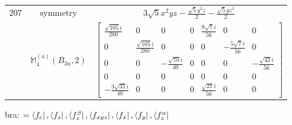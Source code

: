 \documentclass[fleqn,8pt,landscape]{jsarticle}
\begin{document}
\begin{longtable}{ccc}
$ 207 $ & $ \text{symmetry} $ & $ 3 \sqrt{5} x^{2} y z - \frac{\sqrt{5} y^{3} z}{2} - \frac{\sqrt{5} y z^{3}}{2} $ \\
$  $ & $ \mathbb{M}_{4}^{(a)}(B_{3u},2) $ & $ \begin{bmatrix} \frac{\sqrt{105} i}{280} & 0 & 0 & 0 & \frac{9 \sqrt{7} i}{56} & 0 & 0 \\ 0 & \frac{\sqrt{105} i}{280} & 0 & 0 & 0 & - \frac{5 \sqrt{7} i}{56} & 0 \\ 0 & 0 & - \frac{\sqrt{70} i}{40} & 0 & 0 & 0 & - \frac{\sqrt{42} i}{56} \\ 0 & 0 & 0 & 0 & 0 & 0 & 0 \\ - \frac{3 \sqrt{35} i}{40} & 0 & 0 & 0 & \frac{\sqrt{21} i}{56} & 0 & 0 \end{bmatrix} $ \\ \hline
\end{longtable}
bra: $=\bra{f_{c}}, \bra{f_{s}}, \bra{f_{z}^{\beta}}, \bra{f_{xyz}}, \bra{f_{x}}, \bra{f_{y}}, \bra{f_{z}^{\alpha}}$
\end{document}
